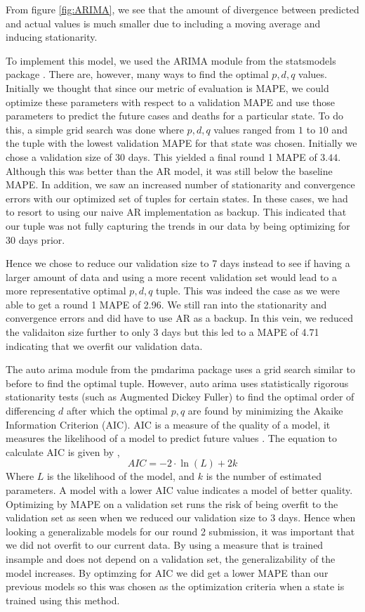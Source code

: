 \documentclass[sigconf,nonacm]{acmart}
\begin{document}
From figure \ref{fig:ARIMA}, we see that the amount of divergence between predicted and actual values is much smaller due to including
a moving average and inducing stationarity.


To implement this model, we used the ARIMA module from the statsmodels package \cite{statsmodels}. There are, however, many
ways to find the optimal $p,d,q$ values. Initially we thought that since our metric of evaluation is MAPE, we could optimize
these parameters with respect to a validation MAPE and use those parameters to predict the future cases and deaths for a 
particular state. To do this, a simple grid search was done where $p,d,q$ values ranged from $1$ to $10$ and the tuple with the
lowest validation MAPE for that state was chosen. Initially we chose a validation size of 30 days. This yielded a final round 1 MAPE of $3.44$.
Although this was better than the AR model, it was still below the baseline MAPE. In addition, we saw an increased number 
of stationarity and convergence errors with our optimized set of tuples for certain states. In these cases, we had to resort to
using our naive AR implementation as backup. This indicated that our tuple was not fully capturing the trends in our data
by being optimizing for 30 days prior. 

Hence we chose to reduce our validation size to 7 days instead to see if having a larger amount of data and using a more
recent validation set would lead to a more representative optimal $p,d,q$ tuple. This was indeed the case as we were able to
get a round 1 MAPE of 2.96. We still ran into the stationarity and convergence errors and did have to use AR as a backup.
In this vein, we reduced the validaiton size further to only 3 days but this led to a MAPE of 4.71 indicating that we overfit
our validation data. 

The auto arima module from the pmdarima package \cite{pmdarima} uses a grid search similar to before to find the optimal
tuple. However, auto arima uses statistically rigorous stationarity tests (such as Augmented Dickey Fuller) to find 
the optimal order of differencing $d$ after which the optimal $p,q$ are found by minimizing the Akaike Information Criterion (AIC).
AIC is a measure of the quality of a model, it measures the likelihood of a model to predict future values \cite{AIC}. The equation
to calculate AIC is given by \cite{AIC},
\begin{equation}
  AIC  = -2 \cdot \ln(L) + 2k
\end{equation} 
Where $L$ is the likelihood of the model, and $k$ is the number of estimated parameters. A model with a lower AIC value
indicates a model of better quality. Optimizing by MAPE on a validation set runs the risk of being overfit to the validation
set as seen when we reduced our validation size to 3 days. Hence when looking a generalizable models for our round 2 submission,
it was important that we did not overfit to our current data. By using a measure that is trained insample and does not depend
on a validation set, the generalizability of the model increases. By optimzing for AIC we did get a lower MAPE than our previous
models so this was chosen as the optimization criteria when a state is trained using this method.
\end{document}

